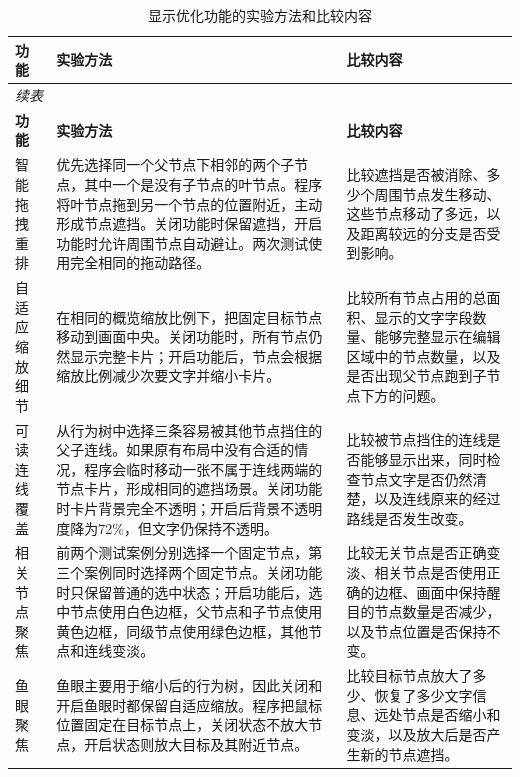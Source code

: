 \documentclass[11pt,a4paper,oneside,extrafontsizes]{memoir}
\begin{document}
\begin{center}

\begin{longtable}{@{}p{} p{} p{}@{}}
\caption{显示优化功能的实验方法和比较内容}\label{tab:display-experiment-methods}\\
\toprule
\textbf{功能} & \textbf{实验方法} & \textbf{比较内容} \\
\midrule
\endfirsthead
\multicolumn{3}{l}{\itshape 续表}\\
\toprule
\textbf{功能} & \textbf{实验方法} & \textbf{比较内容} \\
\midrule
\endhead
智能拖拽重排 & 优先选择同一个父节点下相邻的两个子节点，其中一个是没有子节点的叶节点。程序将叶节点拖到另一个节点的位置附近，主动形成节点遮挡。关闭功能时保留遮挡，开启功能时允许周围节点自动避让。两次测试使用完全相同的拖动路径。 & 比较遮挡是否被消除、多少个周围节点发生移动、这些节点移动了多远，以及距离较远的分支是否受到影响。 \\
自适应缩放细节 & 在相同的概览缩放比例下，把固定目标节点移动到画面中央。关闭功能时，所有节点仍然显示完整卡片；开启功能后，节点会根据缩放比例减少次要文字并缩小卡片。 & 比较所有节点占用的总面积、显示的文字字段数量、能够完整显示在编辑区域中的节点数量，以及是否出现父节点跑到子节点下方的问题。 \\
可读连线覆盖 & 从行为树中选择三条容易被其他节点挡住的父子连线。如果原有布局中没有合适的情况，程序会临时移动一张不属于连线两端的节点卡片，形成相同的遮挡场景。关闭功能时卡片背景完全不透明；开启后背景不透明度降为72\%，但文字仍保持不透明。 & 比较被节点挡住的连线是否能够显示出来，同时检查节点文字是否仍然清楚，以及连线原来的经过路线是否发生改变。 \\
相关节点聚焦 & 前两个测试案例分别选择一个固定节点，第三个案例同时选择两个固定节点。关闭功能时只保留普通的选中状态；开启功能后，选中节点使用白色边框，父节点和子节点使用黄色边框，同级节点使用绿色边框，其他节点和连线变淡。 & 比较无关节点是否正确变淡、相关节点是否使用正确的边框、画面中保持醒目的节点数量是否减少，以及节点位置是否保持不变。 \\
鱼眼聚焦 & 鱼眼主要用于缩小后的行为树，因此关闭和开启鱼眼时都保留自适应缩放。程序把鼠标位置固定在目标节点上，关闭状态不放大节点，开启状态则放大目标及其附近节点。 & 比较目标节点放大了多少、恢复了多少文字信息、远处节点是否缩小和变淡，以及放大后是否产生新的节点遮挡。 \\
\bottomrule
\end{longtable}
\end{center}
\end{document}
